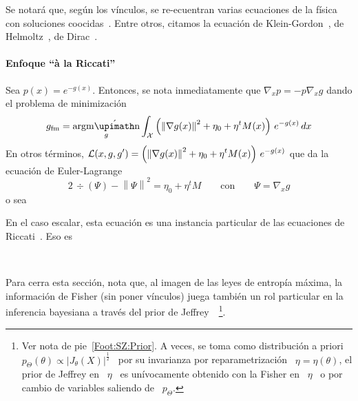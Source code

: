 Se notar\'a que, seg\'un los v\'inculos, se re-ecuentran varias ecuaciones de la
f\'isica con  soluciones coocidas~\cite{Fri98, Fri04}.  Entre  otros, citamos la
ecuaci\'on   de   Klein-Gordon~\cite{Fri90,    FriSof95,   Fri98,   Fri04},   de
Helmoltz~\cite{Fri90, FriSof95,  Fri98, Fri04}, de  Dirac~\cite{FriSof95, Fri98,
Fri04}.



\paragraph{Enfoque ``\`a la Riccati''}

\cite{BorLew96, BorLew95, Ziv98, FriPla99}

Sea $p(x)  = e^{  - g(x)}$. Entonces,  se nota  inmediatamente que
$\nabla_x p = - p \nabla_x g$ dando el problema de minimizaci\'on
%
\[
g_{\mathrm{fm}} = \argmin_g \int_\X  \left( \left\| \nabla g(x) \right\|^2 + \eta_0  
  + \eta^t M(x) \right) \, e^{- g(x) } \, dx
\]
%
En otros t\'erminos, $\displaystyle \mathcal{L}(x , g , g') = \left( \left\| \nabla g(x) \right\|^2 + \eta_0  
  + \eta^t M(x) \right) \, e^{- g(x) }$ que da la ecuaci\'on de Euler-Lagrange
%
\[
2 \, \div\left( \Psi \right) - \left\| \Psi \right\|^2 = \eta_0 + \eta^t M \qquad \mbox{con} \qquad \Psi = \nabla_x g
\]
%
o sea

En el caso escalar, esta ecuaci\'on es una instancia particular de las ecuaciones de Riccati~\cite{Ric1724, Ric59}. Eso es 






\

Para  cerra esta  secci\'on, nota  que,  al imagen  de las  leyes de  entrop\'ia
m\'axima, la informaci\'on  de Fisher (sin poner v\'inculos)  juega tambi\'en un
rol   particular  en   la  inferencia   bayesiana  a   trav\'es  del   prior  de
Jeffrey~\cite{Jef46,    Jef48,    LehCas98,   Rob07}~\footnote{Ver    nota    de
pie~\ref{Foot:SZ:Prior}.   A  veces, se  toma  como  distribuci\'on a  priori  \
$p_\Theta(\theta)  \propto  |J_\theta(X)|^\frac12$  \   por  su  invarianza  por
reparametrizaci\'on  \ $\eta  =  \eta(\theta)$, \ie  el prior  de  Jeffrey en  \
$\eta$ \ es un\'ivocamente obtenido con la Fisher  en \ $\eta$ \ o por cambio de
variables saliendo de \ $p_\Theta$.}.


